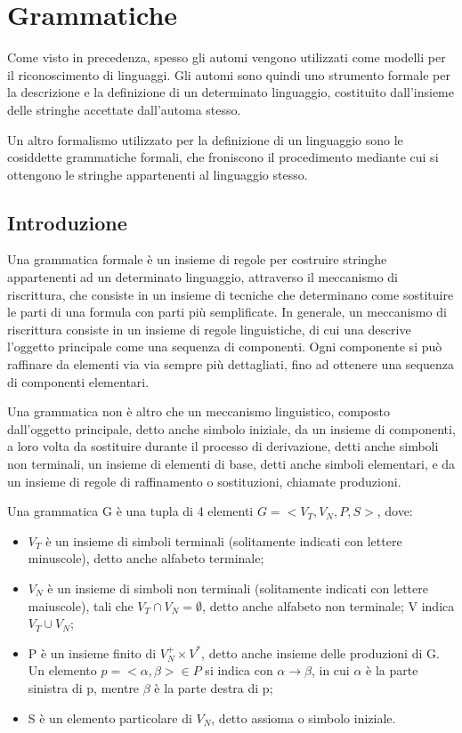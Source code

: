 \chapter{Grammatiche}
  Come visto in precedenza, spesso gli automi vengono utilizzati come modelli per il riconoscimento di linguaggi. Gli automi sono quindi uno strumento formale per la descrizione e la definizione di un determinato linguaggio, costituito dall'insieme delle stringhe accettate dall'automa stesso.

  Un altro formalismo utilizzato per la definizione di un linguaggio sono le cosiddette grammatiche formali, che froniscono il procedimento mediante cui si ottengono le stringhe appartenenti al linguaggio stesso. 
  
  \section{Introduzione}
  Una grammatica formale è un insieme di regole per costruire stringhe appartenenti ad un determinato linguaggio, attraverso il meccanismo di riscrittura, che consiste in un insieme di tecniche che determinano come sostituire le parti di una formula con parti più semplificate. In generale, un meccanismo di riscrittura consiste in un insieme di regole linguistiche, di cui una descrive l'oggetto principale come una sequenza di componenti. Ogni componente si può raffinare da elementi via via sempre più dettagliati, fino ad ottenere una sequenza di componenti elementari.

  Una grammatica non è altro che un meccanismo linguistico, composto dall'oggetto principale, detto anche simbolo iniziale, da un insieme di componenti, a loro volta da sostituire durante il processo di derivazione, detti anche simboli non terminali, un insieme di elementi di base, detti anche simboli elementari, e da un insieme di regole di raffinamento o sostituzioni, chiamate produzioni.

  \begin{definition} \label{definizione grammatica}
    Una grammatica G è una tupla di 4 elementi \(G = <V_T, V_N, P, S>\), dove:
    \begin{itemize}
      \item \(V_T\) è un insieme di simboli terminali (solitamente indicati con lettere minuscole), detto anche alfabeto terminale;
      \item \(V_N\) è un insieme di simboli non terminali (solitamente indicati con lettere maiuscole), tali che \(V_T \cap V_N = \emptyset\), detto anche alfabeto non terminale; V indica \(V_T\cup V_N\);
      \item P è un insieme finito di \(V_N^+\times V^*\), detto anche insieme delle produzioni di G. Un elemento \(p=<\alpha, \beta> \in P\) si indica con \(\alpha\to\beta\), in cui \(\alpha\) è la parte sinistra di p, mentre \(\beta\) è la parte destra di p;
      \item S è un elemento particolare di \(V_N\), detto assioma o simbolo iniziale. 
    \end{itemize}
  \end{definition}

